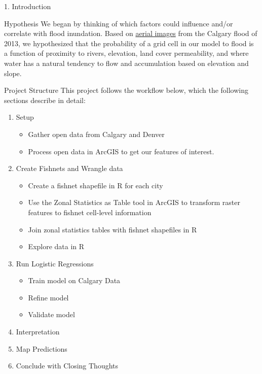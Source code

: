 \documentclass[
  ignorenonframetext,
]{beamer}
\providecommand{\tightlist}{%
  \setlength{\itemsep}{0pt}\setlength{\parskip}{0pt}}
\begin{document}
\begin{frame}[fragile]{1. Introduction}
\begin{block}{Hypothesis}
\protect\hypertarget{hypothesis}{}
We began by thinking of which factors could influence and/or correlate
with flood inundation. Based on
\href{https://www.servirglobal.net/Portals/0/Documents/Articles/ISERV\%20Images/ISERV\%20Calgary_flood\%20V3.jpg}{aerial
images} from the Calgary flood of 2013, we hypothesized that the
probability of a grid cell in our model to flood is a function of
proximity to rivers, elevation, land cover permeability, and where water
has a natural tendency to flow and accumulation based on elevation and
slope.
\end{block}

\begin{block}{Project Structure}
\protect\hypertarget{project-structure}{}
This project follows the workflow below, which the following sections
describe in detail:

\begin{enumerate}
\item
  Setup

  \begin{itemize}
  \tightlist
  \item
    Gather open data from Calgary and Denver
  \item
    Process open data in ArcGIS to get our features of interest.
  \end{itemize}
\item
  Create Fishnets and Wrangle data

  \begin{itemize}
  \tightlist
  \item
    Create a fishnet shapefile in R for each city
  \item
    Use the Zonal Statistics as Table tool in ArcGIS to transform raster
    features to fishnet cell-level information
  \item
    Join zonal statistics tables with fishnet shapefiles in R
  \item
    Explore data in R
  \end{itemize}
\item
  Run Logistic Regressions

  \begin{itemize}
  \tightlist
  \item
    Train model on Calgary Data
  \item
    Refine model
  \item
    Validate model
  \end{itemize}
\item
  Interpretation
\item
  Map Predictions
\item
  Conclude with Closing Thoughts
\end{enumerate}
\end{block}


\end{frame}
\end{document}
